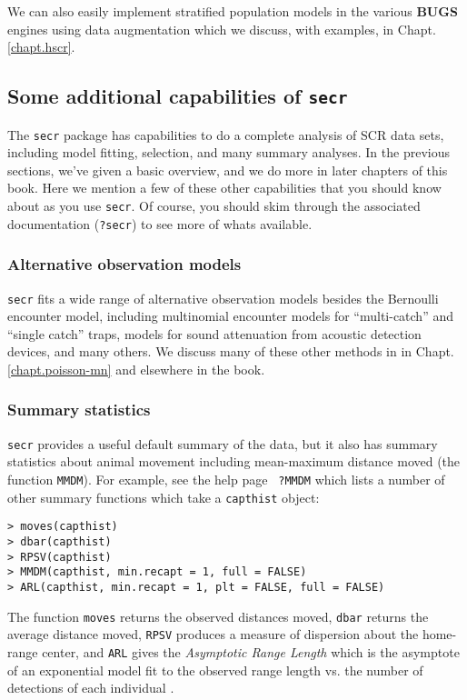 We can also easily implement stratified population models in the
various {\bf BUGS} engines using data augmentation
\citep{converse_royle:2012,royle_converse:2013} which we discuss, with
examples, in Chapt. \ref{chapt.hscr}.


\subsection{Some additional capabilities of \mbox{\tt secr}}

The \mbox{\tt secr} package has capabilities to do a complete analysis
of SCR data sets, including model fitting, selection, and many summary
analyses. In the previous sections, we've given a basic overview, and
we do more in later chapters of this book.  Here we mention a few of
these other capabilities that you should know about as you use
\mbox{\tt secr}. Of course, you should skim through the associated
documentation (\mbox{\tt ?secr}) to see more of whats available.

\subsubsection{Alternative observation models}
\mbox{\tt secr} fits a wide range of alternative observation models
besides the Bernoulli encounter model, including multinomial encounter
models for ``multi-catch'' and ``single catch'' traps, models for
sound attenuation from acoustic detection devices, and many others. We
discuss many of these other methods in in
Chapt. \ref{chapt.poisson-mn} and elsewhere in the book.

\subsubsection{Summary statistics} 
\mbox{\tt secr} provides a useful default summary of the data, but it
also has summary statistics about animal movement including
mean-maximum distance moved (the function \mbox{\tt MMDM}). For example, see the help page \mbox{\tt
  ?MMDM} which lists a number of other summary functions which take a
\mbox{\tt capthist} object:
\begin{verbatim}
> moves(capthist)
> dbar(capthist)
> RPSV(capthist)
> MMDM(capthist, min.recapt = 1, full = FALSE)
> ARL(capthist, min.recapt = 1, plt = FALSE, full = FALSE)
\end{verbatim}
The function \mbox{\tt moves} returns the observed distances moved,
\mbox{\tt dbar} returns the average distance moved, 
\mbox{\tt RPSV} produces a measure of dispersion about the home-range
center, 
and \mbox{\tt ARL} gives the {\it 
Asymptotic Range Length} which is the asymptote of an exponential
model fit to the observed range length vs. the number of
detections of each individual 
\citep{jett_nichols:1987}.




